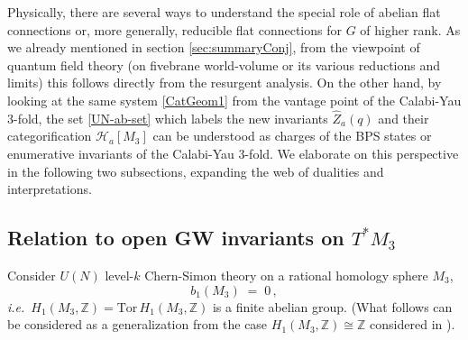 \documentclass[hyper,letterpaper]{JHEP3}
\newcommand{\Z}{{\mathbb Z}}
\renewcommand{\hat}{\widehat}
\def\CH{{\mathcal H}}
\def\ie{{\textit{i.e.}}}
\def\Tor{{\mathrm{Tor}\,}}
\begin{document}
Physically, there are several ways to understand the special role of abelian flat connections or, more generally,
reducible flat connections for $G$ of higher rank. As we already mentioned in section \ref{sec:summaryConj}, from
the viewpoint of quantum field theory (on fivebrane world-volume or its various reductions and limits)
this follows directly from the resurgent analysis. On the other hand,
by looking at the same system \eqref{CatGeom1} from the vantage point of the Calabi-Yau 3-fold,
the set \eqref{UN-ab-set} which labels the new invariants $\hat{Z}_a(q)$ and their categorification $\CH_a[M_3]$
can be understood as charges of the BPS states or enumerative invariants of the Calabi-Yau 3-fold.
We elaborate on this perspective in the following two subsections, expanding the web of dualities and interpretations.

\subsection{Relation to open GW invariants on ${T^*M_3}$}

Consider $U(N)$ level-$k$ Chern-Simon theory on a rational homology sphere $M_3$,
\begin{equation}
	b_1(M_3) \; = \; 0 \,,
\end{equation}
\ie~$H_1(M_3,\Z)=\Tor H_1(M_3,\Z)$ is a finite abelian group. (What follows can be considered as a generalization from the case $H_1(M_3,\Z)\cong \Z$ considered in \cite{Labastida:2000yw}).
\end{document}
